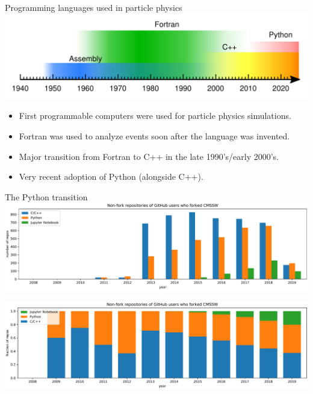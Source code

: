 \documentclass[aspectratio=169]{beamer}
\begin{document}
\begin{frame}{Programming languages used in particle physics}
\large
\vspace{0.5 cm}
\includegraphics[width=\linewidth]{programming-languages.pdf}

\vspace{0.25 cm}
\begin{itemize}
\item First programmable computers were used for particle physics simulations.
\item Fortran was used to analyze events soon after the language was invented.
\item Major transition from Fortran to C++ in the late 1990's/early 2000's.
\item Very recent adoption of Python (alongside C++).
\end{itemize}
\end{frame}

\begin{frame}{The Python transition}
\vspace{0.2 cm}
\includegraphics[width=\linewidth]{github-cmssw-lin.pdf}

\includegraphics[width=\linewidth]{github-cmssw-frac.pdf}
\end{frame}


\begin{frame}{}
\end{frame}
\end{document}
